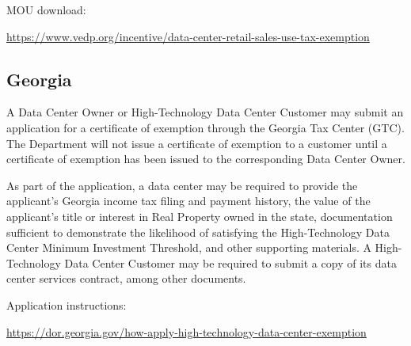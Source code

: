 MOU download:

\url{https://www.vedp.org/incentive/data-center-retail-sales-use-tax-exemption}

\subsection{Georgia}

A Data Center Owner or High-Technology Data Center Customer may submit an application for a certificate of exemption through the Georgia Tax Center (GTC). The Department will not issue a certificate of exemption to a customer until a certificate of exemption has been issued to the corresponding Data Center Owner.

As part of the application, a data center may be required to provide the applicant's Georgia income tax filing and payment history, the value of the applicant's title or interest in Real Property owned in the state, documentation sufficient to demonstrate the likelihood of satisfying the High-Technology Data Center Minimum Investment Threshold, and other supporting materials. A High-Technology Data Center Customer may be required to submit a copy of its data center services contract, among other documents.

Application instructions:

\url{https://dor.georgia.gov/how-apply-high-technology-data-center-exemption}

\FloatBarrier
